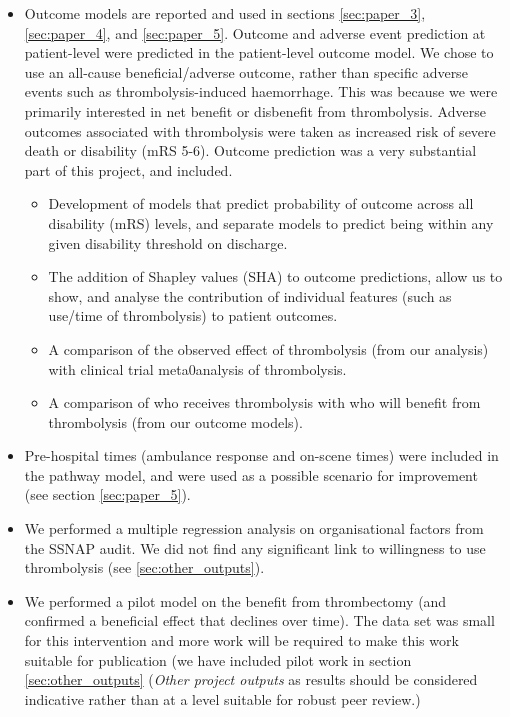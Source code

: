 \begin{itemize}
    \item Outcome models are reported and used in sections \ref{sec:paper_3}, \ref{sec:paper_4}, and \ref{sec:paper_5}. Outcome and adverse event prediction at patient-level were predicted in the patient-level outcome model. We chose to use an all-cause beneficial/adverse outcome, rather than specific adverse events such as thrombolysis-induced haemorrhage. This was because we were primarily interested in net benefit or disbenefit from thrombolysis. Adverse outcomes associated with thrombolysis were taken as increased risk of severe death or disability (mRS 5-6). Outcome prediction was a very substantial part of this project, and included.
    \begin{itemize}
        \item Development of models that predict probability of outcome across all disability (mRS) levels, and separate models to predict being within any given disability threshold on discharge.
        \item The addition of Shapley values (SHA) to outcome predictions, allow us to show, and analyse the contribution of individual features (such as use/time of thrombolysis) to patient outcomes.
        \item A comparison of the observed effect of thrombolysis (from our analysis) with clinical trial meta0analysis of thrombolysis.
        \item A comparison of who receives thrombolysis with who will benefit from thrombolysis (from our outcome models).
    \end{itemize}
    \item Pre-hospital times (ambulance response and on-scene times) were included in the pathway model, and were used as a possible scenario for improvement (see section \ref{sec:paper_5}).    
    \item We performed a multiple regression analysis on organisational factors from the SSNAP audit. We did not find any significant link to willingness to use thrombolysis (see \ref{sec:other_outputs}).
    \item We performed a pilot model on the benefit from thrombectomy (and confirmed a beneficial effect that declines over time). The data set was small for this intervention and more work will be required to make this work suitable for publication (we have included pilot work in section \ref{sec:other_outputs} (\textit{Other project outputs} as results should be considered indicative rather than at a level suitable for robust peer review.)       
\end{itemize}


